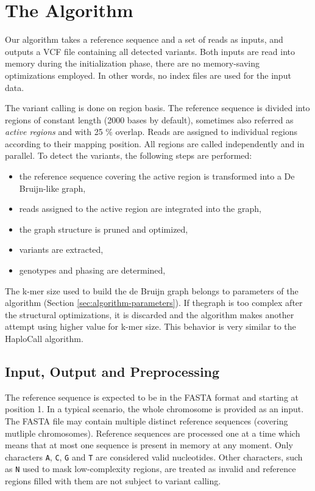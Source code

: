 ﻿\chapter{The Algorithm}
\label{chap:the-algorithm}

Our algorithm takes a reference sequence and a set of reads as inputs, and outputs a VCF file containing all detected variants. Both inputs are read into memory during the initialization phase, there are no memory-saving optimizations employed. In other words, no index files are used for the input data.

The variant calling is done on region basis. The reference sequence is divided into regions of constant length (2000 bases by default), sometimes also referred as \textit{active regions} and with 25 \% overlap. Reads are assigned to individual regions according to their mapping position. All regions are called independently and in parallel. To detect the variants, the following steps are performed:
\begin{itemize}
\item the reference sequence covering the active region is transformed into a De Bruijn-like graph,
\item reads assigned to the active region are integrated into the graph,
\item the graph structure is pruned and optimized,
\item variants are extracted,
\item genotypes and phasing are determined,
\end{itemize}

The k-mer size used to build the de Bruijn graph belongs to parameters of the algorithm (Section \ref{sec:algorithm-parameters}). If thegraph is too complex after the structural optimizations, it is discarded and the algorithm makes another attempt using higher value for k-mer size. This behavior is very similar to the HaploCall algorithm.

\section{Input, Output and Preprocessing}
\label{sec:input-output-and-preprocessing}

The reference sequence is expected to be in the FASTA format and starting at position 1. In a typical scenario, the whole chromosome is provided as an input. The FASTA file may contain multiple distinct reference sequences (covering mutliple chromosomes). Reference sequences are processed one at a time which means that at most one sequence is present in memory at any moment. Only characters \texttt{A}, \texttt{C}, \texttt{G} and \texttt{T} are considered valid nucleotides. Other characters, such as \texttt{N} used to mask low-complexity regions, are treated as invalid and reference regions filled with them are not subject to variant calling.

